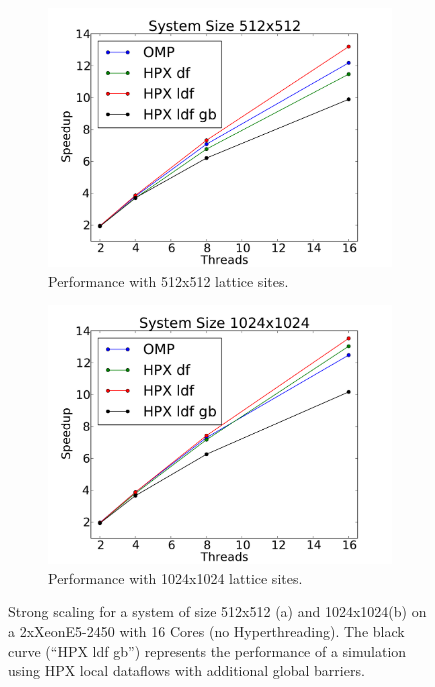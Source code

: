 \documentclass[a4wide,10pt]{scrartcl}
\begin{document}
\begin{figure}
 \begin{subfigure}[b]{0.49\textwidth}
  \centering
  \includegraphics[width=\textwidth]{../osc_lattice_2d/plot/marvin_scaling_512.pdf}\hfill
  \caption{Performance with 512x512 lattice sites.} 
  \label{fig:scaling_marvin2D_512}
 \end{subfigure}
 \begin{subfigure}[b]{0.49\textwidth}
  \centering
  \includegraphics[width=\textwidth]{../osc_lattice_2d/plot/marvin_scaling_1024.pdf}\hfill
  \caption{Performance with 1024x1024 lattice sites.} 
  \label{fig:scaling_marvin2D_1024}
 \end{subfigure}
 \caption{Strong scaling for a system of size 512x512 (a) and 1024x1024(b) on a 2xXeonE5-2450 with 16 Cores (no Hyperthreading). The black curve (``HPX ldf gb'') represents the performance of a simulation using HPX local dataflows with additional global barriers.}
 \label{fig:marvin_scaling2D}
\end{figure}
\end{document}
